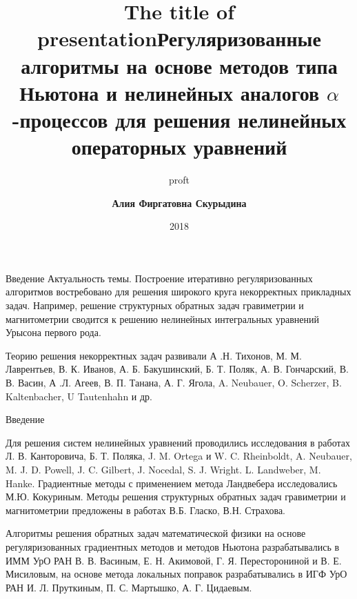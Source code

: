 \documentclass[10pt,pdf, mathserif, hyperref={unicode}]{beamer}
\title{The title of presentation}
\author{proft}
\date{2018}
\begin{document}
	
	\small
	\footnotesize
	
\title[\hspace*{55mm}{\insertpagenumber /\pageref{lastpage}}]{{\small\textbf{Регуляризованные алгоритмы на основе методов типа Ньютона и нелинейных аналогов $\alpha$-процессов для решения нелинейных операторных уравнений}}}
\author[\insertlogo{\em{Алия Фиргатовна Скурыдина}}%
\hspace*{60mm}]{\textbf{\color{blue}Алия Фиргатовна Скурыдина}}
\frame{\titlepage}

\begin{frame}{Введение}{}
%	
	{\color{blue}Актуальность темы.} Построение итеративно регуляризованных алгоритмов востребовано для решения широкого круга некорректных прикладных задач. Например, решение структурных обратных задач гравиметрии и магнитометрии сводится к решению нелинейных интегральных уравнений Урысона первого рода.
	
	\smallskip
	Теорию решения некорректных задач развивали А .Н. Тихонов, М. М. Лаврентьев, В. К. Иванов, А. Б. Бакушинский, Б. Т. Поляк, А. В. Гончарский, В. В. Васин, А .Л. Агеев, В. П. Танана, А. Г. Ягола, A. Neubauer, O. Scherzer, B. Kaltenbacher, U Tautenhahn и др.
	
\end{frame}
\begin{frame}{Введение}
	
	Для решения систем нелинейных уравнений проводились исследования в работах Л. В. Канторовича, Б. Т. Поляка, J. M. Ortega и W. C. Rheinboldt,	A. Neubauer, M. J. D. Powell, 	J. C. Gilbert, J. Nocedal, S. J. Wright.
	L. Landweber, M. Hanke. Градиентные методы с применением
	метода Ландвебера исследовались М.Ю. Кокуриным.
	Методы решения структурных обратных задач гравиметрии и магнитометрии предложены в работах В.Б. Гласко, В.Н. Страхова. 
	
	Алгоритмы решения обратных задач
	математической физики на основе регуляризованных градиентных методов и методов Ньютона разрабатывались в ИММ УрО РАН В. В. Васиным, Е. Н. Акимовой, Г. Я. Пересторониной и В. Е. Мисиловым, на основе метода локальных поправок разрабатывались в ИГФ УрО РАН И. Л. Пруткиным, П. С. Мартышко, А. Г. Цидаевым.
\end{frame}
\end{document}
